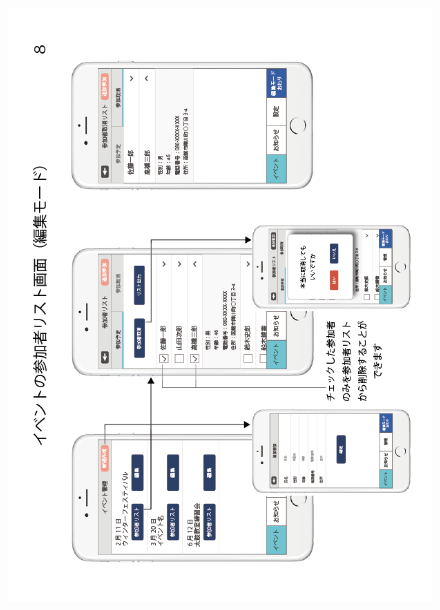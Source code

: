 \begin{figure}[h]
    \begin{center}
    \includegraphics[keepaspectratio, scale=0.7]{appendixs/appendixB_figres/fig8.png}
    \end{center}
\end{figure}

